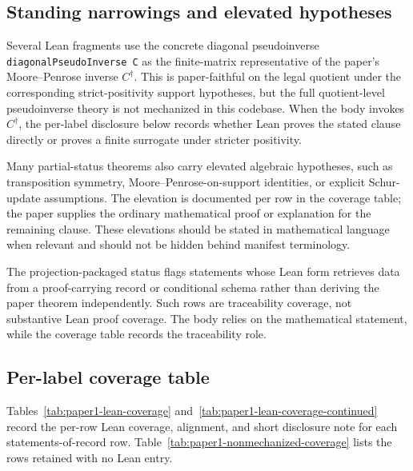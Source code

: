 \documentclass[11pt]{article}
\theoremstyle{definition}
\begin{document}
\subsection{Standing narrowings and elevated hypotheses}
\label{subsec:paper1-standing-narrowings}

Several Lean fragments use the concrete diagonal pseudoinverse \texttt{diagonalPseudoInverse C} as the finite-matrix representative of the paper's Moore--Penrose inverse \(C^\dagger\).  This is paper-faithful on the legal quotient under the corresponding strict-positivity support hypotheses, but the full quotient-level pseudoinverse theory is not mechanized in this codebase.  When the body invokes \(C^\dagger\), the per-label disclosure below records whether Lean proves the stated clause directly or proves a finite surrogate under stricter positivity.

Many partial-status theorems also carry elevated algebraic hypotheses, such as transposition symmetry, Moore--Penrose-on-support identities, or explicit Schur-update assumptions.  The elevation is documented per row in the coverage table; the paper supplies the ordinary mathematical proof or explanation for the remaining clause.  These elevations should be stated in mathematical language when relevant and should not be hidden behind manifest terminology.

The projection-packaged status flags statements whose Lean form retrieves data from a proof-carrying record \citep{Necula1997ProofCarryingCode} or conditional schema rather than deriving the paper theorem independently.  Such rows are traceability coverage, not substantive Lean proof coverage.  The body relies on the mathematical statement, while the coverage table records the traceability role.

\subsection{Per-label coverage table}
\label{subsec:paper1-per-label-coverage}

Tables~\ref{tab:paper1-lean-coverage} and~\ref{tab:paper1-lean-coverage-continued}
record the per-row Lean coverage, alignment, and short disclosure
note for each statements-of-record row.
Table~\ref{tab:paper1-nonmechanized-coverage} lists the rows retained
with no Lean entry.
\end{document}
